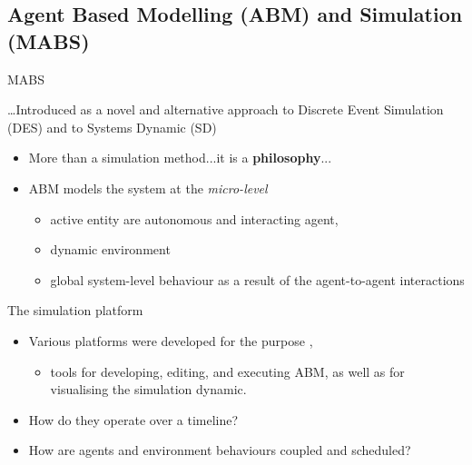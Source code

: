 \documentclass[presentation]{beamer} %
\begin{document}
\subsection{Agent Based Modelling (ABM) and Simulation (MABS)}

\begin{frame}{MABS}

\ldots Introduced as a novel and alternative approach to Discrete Event Simulation (DES) and to Systems Dynamic (SD)

\begin{block}{}
	\begin{itemize}
		\item More than a simulation method...it is a \textbf{philosophy}...    
    		\item ABM models the system at the \emph{micro-level}
		\begin{itemize}
			\item active entity are autonomous and interacting agent, 
			\item dynamic environment
			\item global system-level behaviour as a result of the agent-to-agent interactions
		\end{itemize}
	\end{itemize}
\end{block}

\begin{block}{The simulation platform}
	\begin{itemize}
		\item Various platforms were developed for the purpose \cite{simulationtoolkits-survey}, 
		\begin{itemize}
			\item  tools for developing, editing, and executing ABM, as well as for visualising the simulation dynamic. 
		\end{itemize}
		\item How do they operate over a timeline?
		\item How are agents and environment behaviours coupled and scheduled?
	\end{itemize}
\end{block}


\end{frame}
\end{document}
